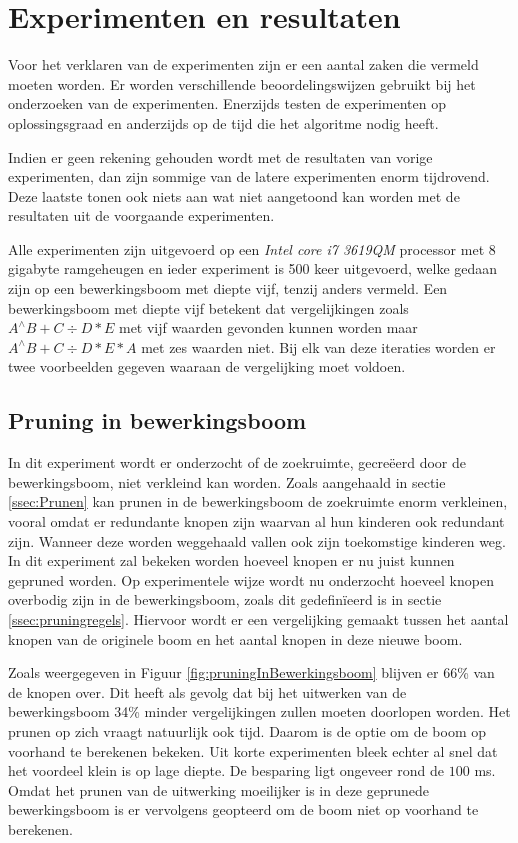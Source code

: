 \documentclass[Main.tex]{subfiles}
\begin{document}
\section{Experimenten en resultaten}
Voor het verklaren van de experimenten zijn er een aantal zaken die vermeld moeten worden. Er worden verschillende beoordelingswijzen gebruikt bij het onderzoeken van de experimenten. Enerzijds testen de experimenten op oplossingsgraad en anderzijds op de tijd die het algoritme nodig heeft. 
\par Indien er geen rekening gehouden wordt met de resultaten van vorige experimenten, dan zijn sommige van de latere experimenten enorm tijdrovend. Deze laatste tonen ook niets aan wat niet aangetoond kan worden met de resultaten uit de voorgaande experimenten. \par Alle experimenten zijn uitgevoerd op een \textit{Intel core i7 3619QM} processor met 8 gigabyte ramgeheugen en ieder experiment is 500 keer uitgevoerd, welke gedaan zijn op een bewerkingsboom met diepte vijf, tenzij anders vermeld. Een bewerkingsboom met diepte vijf betekent dat vergelijkingen zoals $A^{\land}B+C \div D \ast E$ met vijf waarden gevonden kunnen worden maar $A^{\land}B+C \div D \ast E \ast A$ met zes waarden niet. Bij elk van deze iteraties worden er twee voorbeelden gegeven waaraan de vergelijking moet voldoen. 

\subsection{Pruning in bewerkingsboom} \label{ssec:pruning}
In dit experiment wordt er onderzocht of de zoekruimte, gecre\"eerd door de bewerkingsboom, niet verkleind kan worden. Zoals aangehaald in sectie \ref{ssec:Prunen} kan prunen in de bewerkingsboom de zoekruimte enorm verkleinen, vooral omdat er redundante knopen zijn waarvan al hun kinderen ook redundant zijn. Wanneer deze worden weggehaald vallen ook zijn toekomstige kinderen weg. In dit experiment zal bekeken worden hoeveel knopen er nu juist kunnen gepruned worden. Op experimentele wijze wordt nu onderzocht hoeveel knopen overbodig zijn in de bewerkingsboom, zoals dit gedefin\"ieerd is in sectie \ref{ssec:pruningregels}. Hiervoor wordt er een vergelijking gemaakt tussen het aantal knopen van de originele boom en het aantal knopen in deze nieuwe boom.
\par Zoals weergegeven in Figuur \ref{fig:pruningInBewerkingsboom} blijven er 66\% van de knopen over. Dit heeft als gevolg dat bij het uitwerken van de bewerkingsboom 34\% minder vergelijkingen zullen moeten doorlopen worden. Het prunen op zich vraagt natuurlijk ook tijd. Daarom is de optie om de boom op voorhand te berekenen bekeken. Uit korte experimenten bleek echter al snel dat het voordeel klein is op lage diepte. De besparing ligt ongeveer rond de $100$ ms. Omdat het prunen van de uitwerking moeilijker is in deze geprunede bewerkingsboom is er vervolgens geopteerd om de boom niet op voorhand te berekenen.
\end{document}
